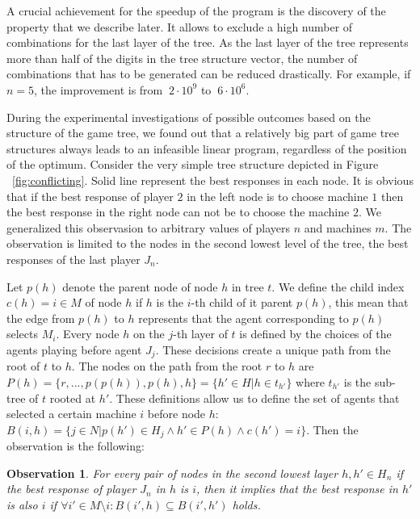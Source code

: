 \documentclass[12pt,a4paper]{article}
\newtheorem{observation}[lemma]{Observation}
\theoremstyle{definition}
\theoremstyle{remark}
\begin{document}
A crucial achievement for the speedup of the program is the discovery of
the property that we describe later. It allows to exclude a high
number of combinations for the last layer of the tree. As the last layer of the
tree represents more than half of the digits in the tree structure vector, the
number of combinations that has to be generated can be reduced drastically.
For example, if $n=5$, the improvement is from $~2\cdot 10^9$ to $~6\cdot 10^6$.

During the experimental investigations of possible outcomes based on the structure
of the game tree, we found out that a relatively big part of game tree structures
always leads to an infeasible linear program, regardless of the position of
the optimum. Consider the very simple tree structure depicted in Figure ~\ref{fig:conflicting}. Solid line represent the best responses in each node.
It is obvious that if the best response of player $2$ in the left node is to choose machine $1$ then the best response in the right node can not be to choose the machine $2$.
We generalized this observasion to arbitrary values of players $n$ and machines $m$. The observation is limited to the nodes in the second lowest level of the tree, the best responses of the last player $J_n$. 

Let $p(h)$ denote the parent node of node $h$ in tree $t$. We define the child index $c(h) = i \in M$ of node $h$ if $h$ is the $i$-th child of it parent $p(h)$, this mean that the edge from $p(h)$ to $h$ represents that the agent corresponding to $p(h)$ selects $M_i$. Every node $h$ on the $j$-th layer of $t$ is defined by the choices of the agents playing before agent $J_j$. These decisions create a unique path from the root of $t$ to $h$. The nodes on the path from the root $r$ to $h$ are $P(h) = \{r,...,p(p(h)), p(h), h\} = \{h'\in H|h \in t_{h'}\}$ where $t_{h'}$ is the sub-tree of $t$ rooted at $h'$. These definitions allow us to define the set of agents that selected a certain machine $i$ before node $h$: $B(i,h) = \{ j\in N |p(h')\in H_j  \land h'\in P(h) \land  c(h') =i\}$. Then the observation is the following: 

\begin{observation}
For every pair of nodes in the second lowest layer $h,h'\in H_n$ if the best response of player $J_n$ in $h$ is $i$, then it implies that the best response in $h'$ is also $i$ if $\forall i' \in M\setminus i: B(i',h)\subseteq B(i',h')$ holds. 
\end{observation} 
\end{document}
